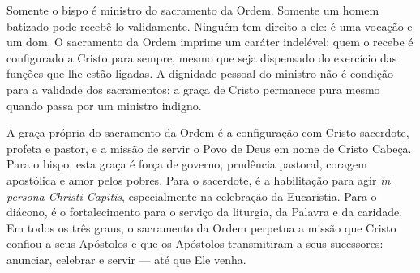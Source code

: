 Somente o bispo é ministro do sacramento da Ordem. Somente um homem batizado pode recebê-lo validamente. Ninguém tem direito a ele: é uma vocação e um dom. O sacramento da Ordem imprime um caráter indelével: quem o recebe é configurado a Cristo para sempre, mesmo que seja dispensado do exercício das funções que lhe estão ligadas. A dignidade pessoal do ministro não é condição para a validade dos sacramentos: a graça de Cristo permanece pura mesmo quando passa por um ministro indigno.

A graça própria do sacramento da Ordem é a configuração com Cristo sacerdote, profeta e pastor, e a missão de servir o Povo de Deus em nome de Cristo Cabeça. Para o bispo, esta graça é força de governo, prudência pastoral, coragem apostólica e amor pelos pobres. Para o sacerdote, é a habilitação para agir \textit{in persona Christi Capitis}, especialmente na celebração da Eucaristia. Para o diácono, é o fortalecimento para o serviço da liturgia, da Palavra e da caridade. Em todos os três graus, o sacramento da Ordem perpetua a missão que Cristo confiou a seus Apóstolos e que os Apóstolos transmitiram a seus sucessores: anunciar, celebrar e servir --- até que Ele venha.
